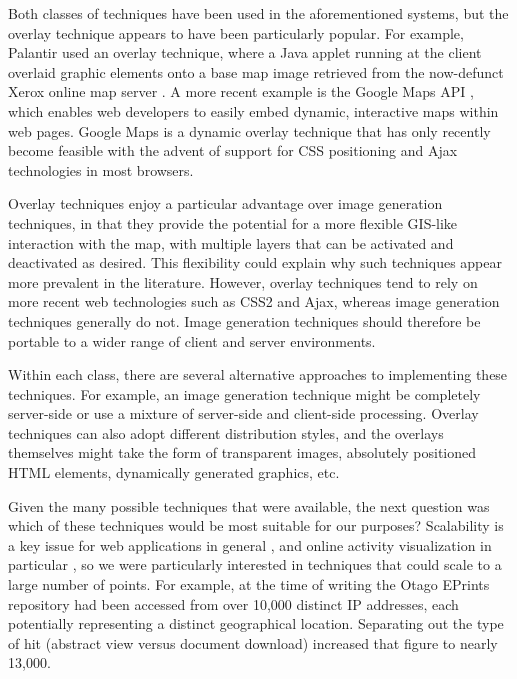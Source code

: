 \documentclass[acmtocl,acmnow]{acmtrans2m}
\begin{document}
Both classes of techniques have been used in the aforementioned systems,
but the overlay technique appears to have been particularly popular. For
example, Palantir used an overlay technique, where a Java applet running
at the client overlaid graphic elements onto a base map image retrieved
from the now-defunct Xerox online map server
\cite{Papa-N-1998-Palantir}. A more recent example is the Google Maps
API \cite{Goog-M-2006-maps}, which enables web developers to easily
embed dynamic, interactive maps within web pages. Google Maps is a
dynamic overlay technique that has only recently become feasible with
the advent of support for CSS positioning and Ajax technologies in most
browsers.

Overlay techniques enjoy a particular advantage over image generation
techniques, in that they provide the potential for a more flexible GIS-like
interaction with the map, with multiple layers that can be activated and
deactivated as desired. This flexibility could explain why such techniques
appear more prevalent in the literature. However, overlay techniques tend
to rely on more recent web technologies such as CSS2 and Ajax, whereas
image generation techniques generally do not. Image generation techniques
should therefore be portable to a wider range of client and server
environments.

Within each class, there are several alternative approaches to
implementing these techniques. For example, an image generation technique
might be completely server-side or use a mixture of server-side and
client-side processing. Overlay techniques can also adopt different
distribution styles, and the overlays themselves might take the form of
transparent images, absolutely positioned HTML elements, dynamically
generated graphics, etc.

Given the many possible techniques that were available, the next question
was which of these techniques would be most suitable for our purposes?
Scalability is a key issue for web applications in general \cite[p.\
28]{Offu-J-2002-quality}, and online activity visualization in
particular \cite[p.\ 50]{Eick-SG-2001-sitevis}, so we were particularly
interested in techniques that could scale to a large number of points. For
example, at the time of writing the Otago EPrints repository had been
accessed from over 10,000 distinct IP addresses, each potentially
representing a distinct geographical location. Separating out the type
of hit (abstract view versus document download) increased that figure to
nearly 13,000.
\end{document}
